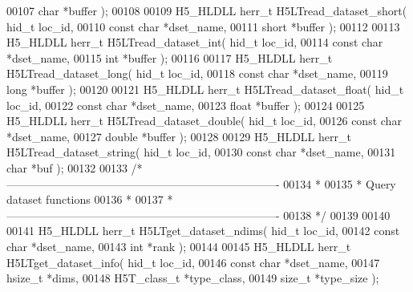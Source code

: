 \begin{DoxyCode}
00107                               \textcolor{keywordtype}{char} *buffer );
00108 
00109 H5\_HLDLL herr\_t  H5LTread\_dataset\_short( hid\_t loc\_id,
00110                                \textcolor{keyword}{const} \textcolor{keywordtype}{char} *dset\_name,
00111                                \textcolor{keywordtype}{short} *buffer );
00112 
00113 H5\_HLDLL herr\_t  H5LTread\_dataset\_int( hid\_t loc\_id,
00114                              \textcolor{keyword}{const} \textcolor{keywordtype}{char} *dset\_name,
00115                              \textcolor{keywordtype}{int} *buffer );
00116 
00117 H5\_HLDLL herr\_t  H5LTread\_dataset\_long( hid\_t loc\_id,
00118                               \textcolor{keyword}{const} \textcolor{keywordtype}{char} *dset\_name,
00119                               \textcolor{keywordtype}{long} *buffer );
00120 
00121 H5\_HLDLL herr\_t  H5LTread\_dataset\_float( hid\_t loc\_id,
00122                                \textcolor{keyword}{const} \textcolor{keywordtype}{char} *dset\_name,
00123                                \textcolor{keywordtype}{float} *buffer );
00124 
00125 H5\_HLDLL herr\_t  H5LTread\_dataset\_double( hid\_t loc\_id,
00126                                 \textcolor{keyword}{const} \textcolor{keywordtype}{char} *dset\_name,
00127                                 \textcolor{keywordtype}{double} *buffer );
00128 
00129 H5\_HLDLL herr\_t  H5LTread\_dataset\_string( hid\_t loc\_id,
00130                                 \textcolor{keyword}{const} \textcolor{keywordtype}{char} *dset\_name,
00131                                 \textcolor{keywordtype}{char} *buf );
00132 
00133 \textcolor{comment}{/*-------------------------------------------------------------------------}
00134 \textcolor{comment}{ *}
00135 \textcolor{comment}{ * Query dataset functions}
00136 \textcolor{comment}{ *}
00137 \textcolor{comment}{ *-------------------------------------------------------------------------}
00138 \textcolor{comment}{ */}
00139 
00140 
00141 H5\_HLDLL herr\_t  H5LTget\_dataset\_ndims( hid\_t loc\_id,
00142                              \textcolor{keyword}{const} \textcolor{keywordtype}{char} *dset\_name,
00143                              \textcolor{keywordtype}{int} *rank );
00144 
00145 H5\_HLDLL herr\_t  H5LTget\_dataset\_info( hid\_t loc\_id,
00146                              \textcolor{keyword}{const} \textcolor{keywordtype}{char} *dset\_name,
00147                              hsize\_t *dims,
00148                              H5T\_class\_t *type\_class,
00149                              \textcolor{keywordtype}{size\_t} *type\_size );

\end{DoxyCode}
